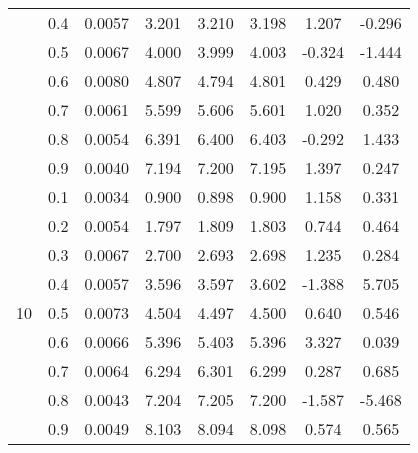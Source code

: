 \documentclass[11pt,a4paper]{report}
\begin{document}
\begin{longtable}{ | c | c || c | c | c | c | c | c | }
 & 0.4 & 0.0057 & 3.201 & 3.210 & 3.198 & 1.207 & -0.296 \\
 & 0.5 & 0.0067 & 4.000 & 3.999 & 4.003 & -0.324 & -1.444 \\
 & 0.6 & 0.0080 & 4.807 & 4.794 & 4.801 & 0.429 & 0.480 \\
 & 0.7 & 0.0061 & 5.599 & 5.606 & 5.601 & 1.020 & 0.352 \\
 & 0.8 & 0.0054 & 6.391 & 6.400 & 6.403 & -0.292 & 1.433 \\
 & 0.9 & 0.0040 & 7.194 & 7.200 & 7.195 & 1.397 & 0.247 \\
 \hline
\multirow{9}{*}{10} & 0.1 & 0.0034 & 0.900 & 0.898 & 0.900 & 1.158 & 0.331 \\
 & 0.2 & 0.0054 & 1.797 & 1.809 & 1.803 & 0.744 & 0.464 \\
 & 0.3 & 0.0067 & 2.700 & 2.693 & 2.698 & 1.235 & 0.284 \\
 & 0.4 & 0.0057 & 3.596 & 3.597 & 3.602 & -1.388 & 5.705 \\
 & 0.5 & 0.0073 & 4.504 & 4.497 & 4.500 & 0.640 & 0.546 \\
 & 0.6 & 0.0066 & 5.396 & 5.403 & 5.396 & 3.327 & 0.039 \\
 & 0.7 & 0.0064 & 6.294 & 6.301 & 6.299 & 0.287 & 0.685 \\
 & 0.8 & 0.0043 & 7.204 & 7.205 & 7.200 & -1.587 & -5.468 \\
 & 0.9 & 0.0049 & 8.103 & 8.094 & 8.098 & 0.574 & 0.565 \\
 \hline
\hline
\end{longtable}
\end{document}
